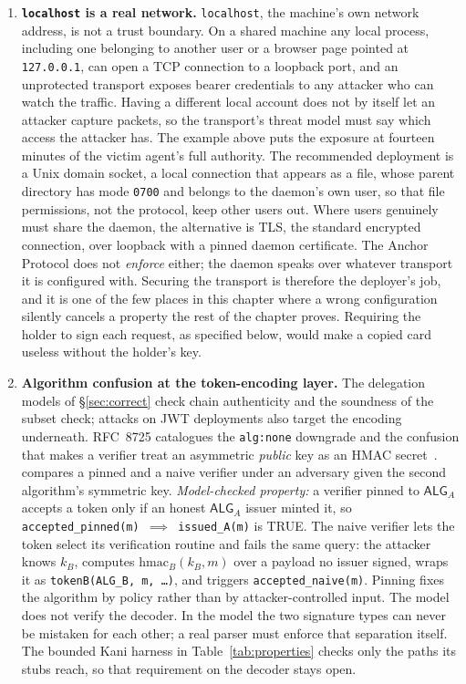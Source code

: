 \documentclass[11pt,a4paper]{article}
\theoremstyle{definition}
\begin{document}
\begin{enumerate}
  \item \textbf{\texttt{localhost} is a real network.} \texttt{localhost}, the machine's own network address, is not a trust boundary. On a shared machine any local process, including one belonging to another user or a browser page pointed at \texttt{127.0.0.1}, can open a TCP connection to a loopback port, and an unprotected transport exposes bearer credentials to any attacker who can watch the traffic. Having a different local account does not by itself let an attacker capture packets, so the transport's threat model must say which access the attacker has. The example above puts the exposure at fourteen minutes of the victim agent's full authority. The recommended deployment is a Unix domain socket, a local connection that appears as a file, whose parent directory has mode \texttt{0700} and belongs to the daemon's own user, so that file permissions, not the protocol, keep other users out. Where users genuinely must share the daemon, the alternative is TLS, the standard encrypted connection, over loopback with a pinned daemon certificate. The Anchor Protocol does not \emph{enforce} either; the daemon speaks over whatever transport it is configured with. Securing the transport is therefore the deployer's job, and it is one of the few places in this chapter where a wrong configuration silently cancels a property the rest of the chapter proves. Requiring the holder to sign each request, as specified below, would make a copied card useless without the holder's key.
  \item \textbf{Algorithm confusion at the token-encoding layer.} The delegation models of \S\ref{sec:correct} check chain authenticity and the soundness of the subset check; attacks on JWT deployments also target the encoding underneath. RFC~8725 catalogues the \texttt{alg:none} downgrade and the confusion that makes a verifier treat an asymmetric \emph{public} key as an HMAC secret~.
   compares a pinned and a naive
  verifier under an adversary given the second algorithm's symmetric key.
  \emph{Model-checked property:} a verifier pinned to $\mathsf{ALG}_A$ accepts a
  token only if an honest $\mathsf{ALG}_A$ issuer minted it, so
  \texttt{accepted\_pinned(m) $\implies$ issued\_A(m)} is TRUE.
  The naive verifier lets the token select its verification routine and fails
  the same query: the attacker knows $k_B$, computes $\mathrm{hmac}_B(k_B,m)$
  over a payload no issuer signed, wraps it as
  \texttt{tokenB(ALG\_B,\,m,\,\ldots)}, and triggers
  \texttt{accepted\_naive(m)}. Pinning fixes the algorithm by policy rather than
  by attacker-controlled input. The model does not verify the decoder. In the
  model the two signature types can never be mistaken for each other; a real
  parser must enforce that separation itself. The bounded Kani harness in
  Table~\ref{tab:properties} checks only the paths its stubs reach, so that
  requirement on the decoder stays open.
\end{enumerate}
\end{document}
